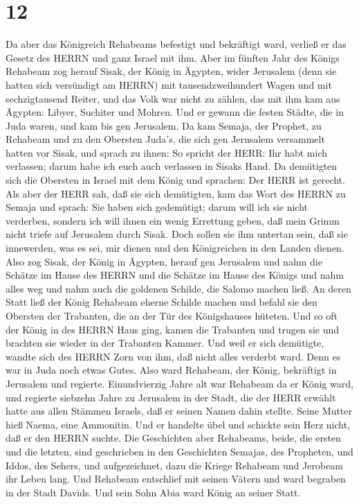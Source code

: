 \hypertarget{section-11}{%
\section{12}\label{section-11}}

 Da aber das Königreich Rehabeams befestigt und bekräftigt
ward, verließ er das Gesetz des HERRN und ganz Israel mit ihm.
 Aber im fünften Jahr des Königs Rehabeam zog herauf Sisak,
der König in Ägypten, wider Jerusalem (denn sie hatten sich versündigt
am HERRN)  mit tausendzweihundert Wagen und mit
sechzigtausend Reiter, und das Volk war nicht zu zählen, das mit ihm kam
aus Ägypten: Libyer, Suchiter und Mohren.  Und er gewann die
festen Städte, die in Juda waren, und kam bis gen Jerusalem.
 Da kam Semaja, der Prophet, zu Rehabeam und zu den Obersten
Juda's, die sich gen Jerusalem versammelt hatten vor Sisak, und sprach
zu ihnen: So spricht der HERR: Ihr habt mich verlassen; darum habe ich
euch auch verlassen in Sisaks Hand.  Da demütigten sich die
Obersten in Israel mit dem König und sprachen: Der HERR ist gerecht.
 Als aber der HERR sah, daß sie sich demütigten, kam das
Wort des HERRN zu Semaja und sprach: Sie haben sich gedemütigt; darum
will ich sie nicht verderben, sondern ich will ihnen ein wenig Errettung
geben, daß mein Grimm nicht triefe auf Jerusalem durch Sisak.
 Doch sollen sie ihm untertan sein, daß sie innewerden, was
es sei, mir dienen und den Königreichen in den Landen dienen.
 Also zog Sisak, der König in Ägypten, herauf gen Jerusalem
und nahm die Schätze im Hause des HERRN und die Schätze im Hause des
Königs und nahm alles weg und nahm auch die goldenen Schilde, die Salomo
machen ließ.  An deren Statt ließ der König Rehabeam eherne
Schilde machen und befahl sie den Obersten der Trabanten, die an der Tür
des Königshauses hüteten.  Und so oft der König in des
HERRN Haus ging, kamen die Trabanten und trugen sie und brachten sie
wieder in der Trabanten Kammer.  Und weil er sich
demütigte, wandte sich des HERRN Zorn von ihm, daß nicht alles verderbt
ward. Denn es war in Juda noch etwas Gutes.  Also ward
Rehabeam, der König, bekräftigt in Jerusalem und regierte. Einundvierzig
Jahre alt war Rehabeam da er König ward, und regierte siebzehn Jahre zu
Jerusalem in der Stadt, die der HERR erwählt hatte aus allen Stämmen
Israels, daß er seinen Namen dahin stellte. Seine Mutter hieß Naema,
eine Ammonitin.  Und er handelte übel und schickte sein
Herz nicht, daß er den HERRN suchte.  Die Geschichten aber
Rehabeams, beide, die ersten und die letzten, sind geschrieben in den
Geschichten Semajas, des Propheten, und Iddos, des Sehers, und
aufgezeichnet, dazu die Kriege Rehabeam und Jerobeam ihr Leben lang.
 Und Rehabeam entschlief mit seinen Vätern und ward
begraben in der Stadt Davids. Und sein Sohn Abia ward König an seiner
Statt.

